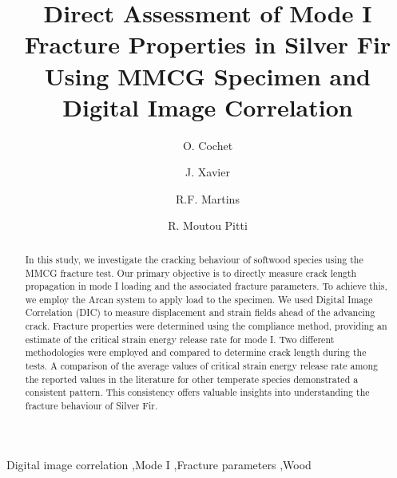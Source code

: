 \documentclass[3p,times,procedia]{elsarticle}
\begin{document}
\begin{frontmatter}



%

\title{Direct Assessment of Mode I Fracture Properties in Silver Fir Using MMCG Specimen and Digital Image Correlation}


\author[a]{O. Cochet}
\author[b,c]{J. Xavier}
\author[b,c]{R.F. Martins}
\author[a]{R. Moutou Pitti}


\address[a]{Université Clermont Auvergne, Clermont Auvergne INP, Institut Pascal, Clermont-Ferrand, France}
\address[b]{UNIDEMI, Department of Mechanical and Industrial Engineering, NOVA School of Science and Technology, Universidade NOVA de Lisboa, 2829-516 Caparica, Portugal}
\address[c]{Laboratório Associado de Sistemas Inteligentes, LASI, 4800-058 Guimarães, Portugal}


\begin{abstract}
In this study, we investigate the cracking behaviour of softwood species using the MMCG fracture test. Our primary objective is to directly measure crack length propagation in mode I loading and the associated fracture parameters. To achieve this, we employ the Arcan system to apply load to the specimen. We used Digital Image Correlation (DIC) to measure displacement and strain fields ahead of the advancing crack. Fracture properties were determined using the compliance method, providing an estimate of the critical strain energy release rate for mode I. Two different methodologies were employed and compared to determine crack length during the tests. A comparison of the average values of critical strain energy release rate among the reported values in the literature for other temperate species demonstrated a consistent pattern. This consistency offers valuable insights into understanding the fracture behaviour of Silver Fir.
\end{abstract}

\begin{keyword}
Digital image correlation \sep Mode I \sep Fracture parameters \sep Wood
\end{keyword}
\end{frontmatter}
\end{document}
